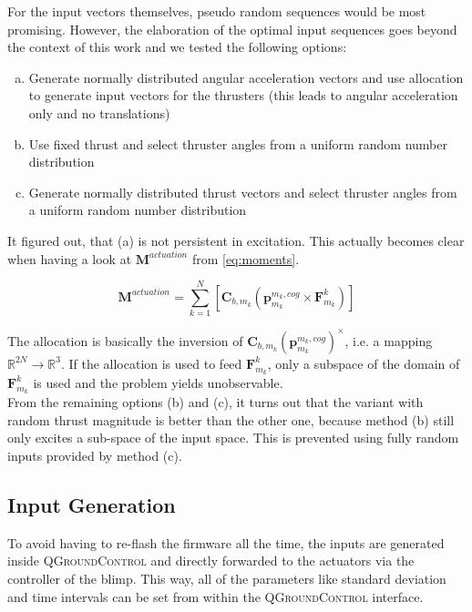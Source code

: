 For the input vectors themselves, pseudo random sequences would be most promising.
However, the elaboration of the optimal input sequences goes beyond the context of this work and we tested the following options:
\begin{enumerate}[(a)]
\item Generate normally distributed angular acceleration vectors and use allocation to generate input vectors for the thrusters (this leads to angular acceleration only and no translations)
\item Use fixed thrust and select thruster angles from a uniform random number distribution
\item Generate normally distributed thrust vectors and select thruster angles from a uniform random number distribution
\end{enumerate}
It figured out, that (a) is not persistent in excitation.
This actually becomes clear when having a look at $\mathbf{M}^{actuation}$ from \cref{eq:moments}.

\begin{equation}
\label{eq:m_actuation}
\mathbf{M}^{actuation} = \sum_{k=1}^N  \left[  \mathbf{C}_{b,m_k} \left( \mathbf{p}^{m_k,cog}_{m_k} \times \mathbf{F}^k_{m_k} \right)  \right]
\end{equation}

The allocation is basically the inversion of $\mathbf{C}_{b,m_k} ( \mathbf{p}^{m_k,cog}_{m_k})^\times$, i.e. a mapping $\mathbb{R}^{2N} \rightarrow \mathbb{R}^3$.
If the allocation is used to feed $\mathbf{F}^k_{m_k}$, only a subspace of the domain of $\mathbf{F}^k_{m_k}$ is used and the problem yields unobservable.
\\

From the remaining options (b) and (c), it turns out that the variant with random thrust magnitude is better than the other one, because method (b) still only excites a sub-space of the input space.
This is prevented using fully random inputs provided by method (c).

\subsection{Input Generation}
\label{sub:input_generation}
To avoid having to re-flash the firmware all the time, the inputs are generated inside \textsc{QGroundControl} and directly forwarded to the actuators via the controller of the blimp.
This way, all of the parameters like standard deviation and time intervals can be set from within the \textsc{QGroundControl} interface.

